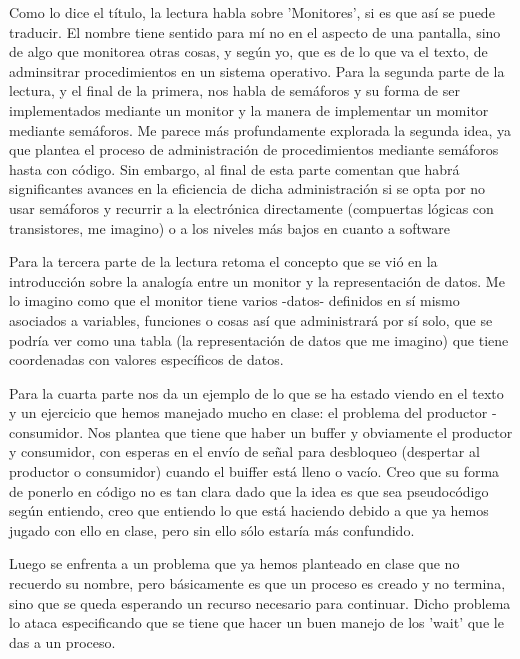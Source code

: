 \documentclass[twocolumn, letterpaper,aps,pra,10pt]{revtex4-1}
\begin{document}
Como lo dice el título, la lectura habla sobre 'Monitores', si es que así se puede traducir. El nombre tiene sentido para mí no en el aspecto de una pantalla, sino de algo que monitorea otras cosas, y según yo, que es de lo que va el texto, de adminsitrar procedimientos en un sistema operativo. Para la segunda parte de la lectura, y el final de la primera, nos habla de semáforos y su forma de ser implementados mediante un monitor y la manera de implementar un momitor mediante semáforos. Me parece más profundamente explorada la segunda idea, ya que plantea el proceso de administración de procedimientos mediante semáforos hasta con código. Sin embargo, al final de esta parte comentan que habrá significantes avances en la eficiencia de dicha administración si se opta por no usar semáforos y recurrir a la electrónica directamente (compuertas lógicas con transistores, me imagino) o a los niveles más bajos en cuanto a software

Para la tercera parte de la lectura retoma el concepto que se vió en la introducción sobre la analogía entre un monitor y la representación de datos. Me lo imagino como que el monitor tiene varios -datos- definidos en sí mismo asociados a variables, funciones o cosas así que administrará por sí solo, que se podría ver como una tabla (la representación de datos que me imagino) que tiene coordenadas con valores específicos de datos. 

Para la cuarta parte nos da un ejemplo de lo que se ha estado viendo en el texto y un ejercicio que hemos manejado mucho en clase: el problema del productor - consumidor. Nos plantea que tiene que haber un buffer y obviamente el productor y consumidor, con esperas en el envío de señal para desbloqueo (despertar al productor o consumidor) cuando el buiffer está lleno o vacío. Creo que su forma de ponerlo en código no es tan clara dado que la idea es que sea pseudocódigo según entiendo, creo que entiendo lo que está haciendo debido a que ya hemos jugado con ello en clase, pero sin ello sólo estaría más confundido. 

Luego se enfrenta a un problema que ya hemos planteado en clase que no recuerdo su nombre, pero básicamente es que un proceso es creado y no termina, sino que se queda esperando un recurso necesario para continuar. Dicho problema lo ataca especificando que se tiene que hacer un buen manejo de los 'wait' que le das a un proceso. 
\end{document}
